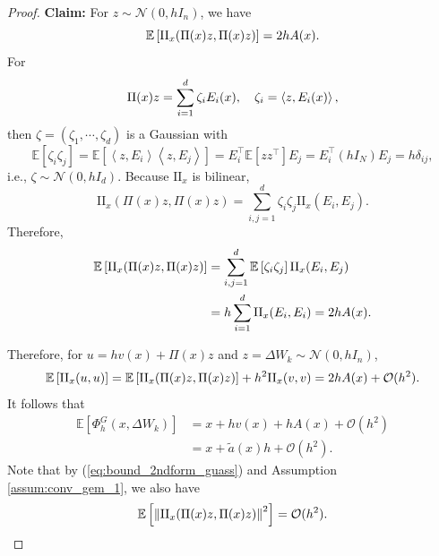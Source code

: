 \begin{proof}
    \vspace{0.25em}
    \textbf{Claim:} For $z \sim \mathcal{N}(0,hI_n)$, we have
    \begin{equation*}
        \mathbb{E}\left[\mathrm{II}_x(\Pi(x)z,\Pi(x)z)\right] = 2hA(x).
    \end{equation*}
    For
    \begin{equation*}
        \Pi(x)z = \sum_{i=1}^d \zeta_i E_i(x),\quad \zeta_i = \left\langle z,E_i(x) \right\rangle,
    \end{equation*}
    then $\zeta = (\zeta_1,\cdots,\zeta_d)$ is a Gaussian with
    \begin{equation*}
        \mathbb{E}\left[\zeta_i \zeta_j\right]=\mathbb{E}\left[\left\langle z, E_i\right\rangle\left\langle z, E_j\right\rangle\right]=E_i^{\top} \mathbb{E}\left[z z^{\top}\right] E_j=E_i^{\top}\left(h I_N\right) E_j=h \delta_{i j},
    \end{equation*}
    i.e., $\zeta \sim \mathcal{N}(0,hI_d)$. Because $\mathrm{II}_x$ is bilinear,
    \begin{equation}\label{eq:bound_2ndform_guass}
        \mathrm{II}_x(\Pi(x)z,\Pi(x)z) = \sum_{i,j=1}^d \zeta_i\zeta_j \mathrm{II}_x(E_i,E_j).
    \end{equation}
    Therefore,
    \begin{align*}
        \mathbb{E}\left[\mathrm{II}_x(\Pi(x)z,\Pi(x)z)\right] &= \sum_{i,j=1}^d \mathbb{E}\left[\zeta_i\zeta_j\right] \mathrm{II}_x(E_i,E_j) \\
        &= h \sum_{i=1}^d \mathrm{II}_x(E_i,E_i)= 2hA(x).
    \end{align*}

    Therefore, for $u = hv(x) + \Pi(x)z$ and $z = \Delta W_k \sim \mathcal{N}(0,hI_n)$,
    \begin{equation*}
        \mathbb{E}\left[\mathrm{II}_x(u,u)\right] = \mathbb{E}\left[\mathrm{II}_x(\Pi(x)z,\Pi(x)z)\right] + h^2\mathrm{II}_x(v,v) = 2hA(x) + \mathcal{O}(h^2).
    \end{equation*}
    It follows that
    \begin{align*}
        \mathbb{E}\left[\Phi_h^G(x, \Delta W_k)\right] & =x+ h v(x)+h A(x)+\mathcal{O}(h^2) \\
        & =x + \tilde{a}(x) h+\mathcal{O}(h^2).
    \end{align*}
    Note that by (\ref{eq:bound_2ndform_guass}) and Assumption \ref{assum:conv_gem_1}, we also have
    \begin{equation*}
        \mathbb{E}\left[\left\lVert\mathrm{II}_x(\Pi(x)z,\Pi(x)z)\right\lVert^2\right] = \mathcal{O}(h^2).
    \end{equation*}


\end{proof}
